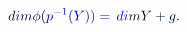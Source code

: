 \documentclass[12pt]{article}
\begin{document}
\makeatletter
\renewcommand*{\@textcolor}[3]{%
  \protect\leavevmode
  \begingroup
    \color#1{#2}#3%
  \endgroup
}
\makeatother
\begin{displaymath}
\mathcolor[RGB]{0,0,15}{\operatorname*} { \mathcolor[RGB]{0,0,30}{d} \mathcolor[RGB]{0,0,45}{i} \mathcolor[RGB]{0,0,60}{m} } \mathcolor[RGB]{0,0,75}{\phi} \mathcolor[RGB]{0,0,90}{(} \mathcolor[RGB]{0,0,105}{p} ^ { \mathcolor[RGB]{0,0,120}{-} \mathcolor[RGB]{0,0,135}{1} } \mathcolor[RGB]{0,0,150}{(} \mathcolor[RGB]{0,0,165}{Y} \mathcolor[RGB]{0,0,180}{)} \mathcolor[RGB]{0,0,195}{)} \mathcolor[RGB]{0,0,210}{=} \mathcolor[RGB]{0,0,225}{\operatorname*} { \mathcolor[RGB]{0,0,240}{d} \mathcolor[RGB]{0,0,255}{i} \mathcolor[RGB]{0,15,0}{m} } \mathcolor[RGB]{0,15,15}{Y} \mathcolor[RGB]{0,15,30}{+} \mathcolor[RGB]{0,15,45}{g} \mathcolor[RGB]{0,15,60}{.}
\end{displaymath}
\end{document}
